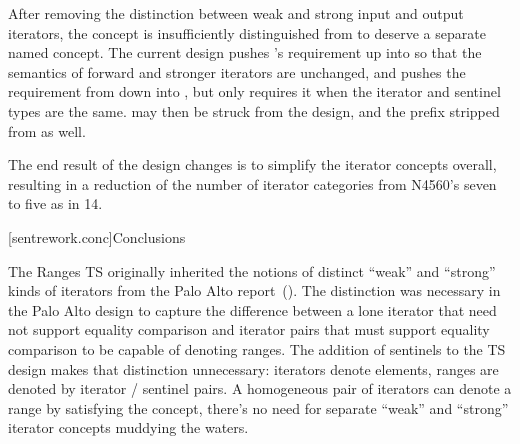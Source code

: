 \pnum
After removing the distinction between weak and strong input and output
iterators, the  concept is insufficiently distinguished from
 to deserve a separate named concept. The current design pushes
's  requirement up into
 so that the semantics of forward and stronger iterators
are unchanged, and pushes the  requirement from
 down into , but only requires it when the
iterator and sentinel types are the same.  may then be struck
from the design, and the  prefix stripped from 
as well.

\pnum
The end result of the design changes is to simplify the iterator concepts
overall, resulting in a reduction of the number of iterator categories from
N4560's seven to five as in \Cpp{}14.

[sentrework.conc]{Conclusions}

\pnum
The Ranges TS originally inherited the notions of distinct ``weak'' and
``strong'' kinds of iterators from the Palo Alto report~(\cite{palo-alto}).
The distinction was necessary in the Palo Alto design to capture the difference
between a lone iterator that need not support equality comparison and iterator
pairs that must support equality comparison to be capable of denoting ranges.
The addition of sentinels to the TS design makes that distinction unnecessary:
iterators denote elements, ranges are denoted by iterator / sentinel pairs. A
homogeneous pair of iterators can denote a range by satisfying the
 concept, there's no need for separate ``weak'' and
``strong'' iterator concepts muddying the waters.
